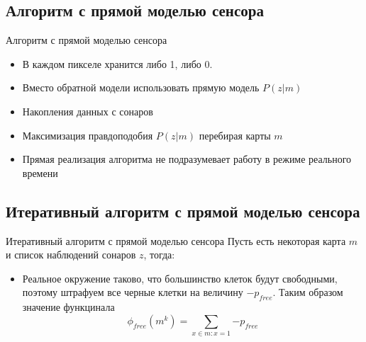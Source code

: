 \documentclass[9pt]{beamer}
\begin{document}
\subsection{Алгоритм с прямой моделью сенсора}
\begin{frame}{Алгоритм с прямой моделью сенсора}
\begin{itemize}
  \item
  {
    В каждом пикселе хранится либо 1, либо 0. 
  }
  \item
  {
    Вместо обратной модели использовать прямую модель $P(z|m)$
  }
  \item
  {
    Накопления данных с сонаров
  }
  \item
  {
    Максимизация правдоподобия $P(z|m)$ перебирая карты $m$
  }
  \item
  {
    Прямая реализация алгоритма не подразумевает работу в режиме реального времени
  }
\end{itemize}
\end{frame}

\subsection{Итеративный алгоритм с прямой моделью сенсора}

\begin{frame}{Итеративный алгоритм с прямой моделью сенсора}
Пусть есть некоторая карта $m$ и список наблюдений сонаров $z$, тогда:
\begin{itemize}
  \item
  {
    Реальное окружение таково, что большинство клеток будут свободными, поэтому штрафуем все черные клетки на величину $-p_{free}$. Таким образом значение функцинала $$\phi_{free}(m^{k}) = \sum_{x \in m: x=1}{-p_{free}}$$
  }
\end{itemize}
\end{frame}
\end{document}
